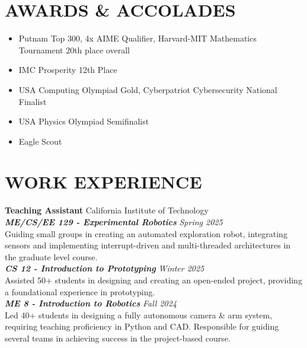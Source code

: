 \documentclass[letterpaper,10pt]{extarticle}
\begin{document}
\section*{AWARDS \& ACCOLADES}
\begin{itemize}
    \item Putnam Top 300, 4x AIME Qualifier, Harvard-MIT Mathematics Tournament 20th place overall 
    \item IMC Prosperity 12th Place
    \item USA Computing Olympiad Gold, Cyberpatriot Cybersecurity National Finalist
    \item USA Physics Olympiad Semifinalist
    \item Eagle Scout 
\end{itemize}


\section*{WORK EXPERIENCE}
\noindent
\textbf{Teaching Assistant} \hfill California Institute of Technology\\ %
\textbf{\textit{ME/CS/EE 129 - Experimental Robotics}} \hfill \textit{Spring 2025} \\
Guiding small groups in creating an automated exploration robot, integrating sensors and implementing interrupt-driven and multi-threaded architectures in the graduate level course.\\
\textbf{\textit{CS 12 - Introduction to Prototyping}} \hfill \textit{Winter 2025} \\%
 Assisted 50+ students in designing and creating an open-ended project, providing a foundational experience in prototyping. 
 \vspace{1mm} \\
\textbf{\textit{ME 8 - Introduction to Robotics}} \hfill \textit{Fall 2024} \\%
 Led 40+ students in designing a fully autonomous camera \& arm system, requiring teaching proficiency in Python and CAD. Responsible for guiding several teams in achieving success in the project-based course.
 

\end{document}
